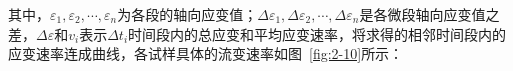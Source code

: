 其中，$\varepsilon_1,\varepsilon_2,\cdots,\varepsilon_n$为各段的轴向应变值；$\Delta{\varepsilon_1},\Delta{\varepsilon_2},\cdots,\Delta{\varepsilon_n}$是各微段轴向应变值之差，$\Delta{\varepsilon}$和$v_i$表示$\Delta{t_i}$时间段内的总应变和平均应变速率，将求得的相邻时间段内的应变速率连成曲线，各试样具体的流变速率如图~\ref{fig:2-10}所示：

\begin{figure}[ht!]
    \centering
\end{figure}
